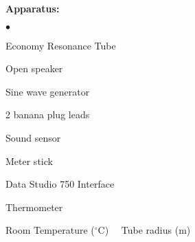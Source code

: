 {\noindent \bf Apparatus:} \begin{list}{$\bullet$}{\itemsep0pt }

\item Economy Resonance Tube 
\item Open speaker
\item Sine wave generator
\item 2 banana plug leads
\item Sound sensor
\item Meter stick
\item Data Studio 750 Interface
\item Thermometer

\end{list}

\noindent Room Temperature ($^\circ$C) \hrulefill \ \  Tube radius (m) \hrulefill

\vspace{5mm}

